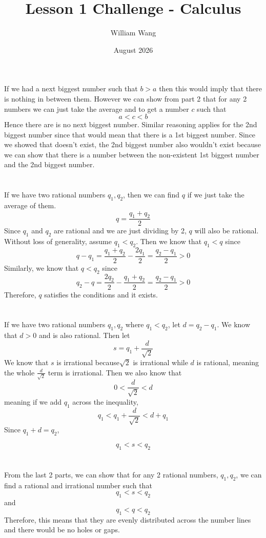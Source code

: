 \documentclass{article}
\title{Lesson 1 Challenge - Calculus}
\author{William Wang}
\date{August 2026}
\begin{document}
\maketitle

\section{}
If we had a next biggest number such that \(b > a\) then this would imply that there is nothing in between them. However we can show from part 2 that for any 2 numbers we can just take the average and to get a number \(c\) such that 
\[a < c < b\]
Hence there are is no next biggest number. Similar reasoning applies for the 2nd biggest number since that would mean that there is a 1st biggest number. Since we showed that doesn't exist, the 2nd biggest number also wouldn't exist because we can show that there is a number between the non-existent 1st biggest number and the 2nd biggest number. 
\section{}
 If we have two rational numbers \(q_1, q_2\), then we can find \(q\) if we just take the average of them. 
\[q = \frac{q_1+q_2}{2}\]
Since \(q_1\) and \(q_2\) are rational and we are just dividing by 2, \(q\) will also be rational. Without loss of generality, assume \(q_1 < q_2\). Then we know that \(q_1 < q\) since 
\[q - q_1 = \frac{q_1+q_2}{2} - \frac{2q_1}{2} = \frac{q_2-q_1}{2} > 0\]
Similarly, we know that \(q < q_2\) since 
\[q_2 - q = \frac{2q_2}{2} - \frac{q_1+q_2}{2} = \frac{q_2-q_1}{2} >0 \]
Therefore, \(q\) satisfies the conditions and it exists. 
\section{}
If we have two rational numbers \(q_1, q_2\) where \(q_1 < q_2\), let \(d= q_2-q_1\). We know that \(d >0\) and is also rational. Then let 
\[s = q_1 + \frac{d}{\sqrt{2}}\]
We know that \(s\) is irrational because\(\sqrt{2}\) is irrational while \(d\) is rational, meaning the whole \(\frac{d}{\sqrt{2}}\) term is irrational. Then we also know that 
\[0 < \frac{d}{\sqrt{2}} < d\]
meaning if we add \(q_1\) across the inequality, 
\[q_1 < q_1 + \frac{d}{\sqrt{2}} < d+q_1\]
Since \(q_1 + d = q_2\), 

\[q_1 < s < q_2\]
\section{}
From the last 2 parts, we can show that for any 2 rational numbers, \(q_1, q_2\), we can find a rational and irrational number such that 
\[q_1 < s <q_2\] and 
\[q_1<q<q_2\]
Therefore, this means that they are evenly distributed across the number lines and there would be no holes or gaps. 
\end{document}
